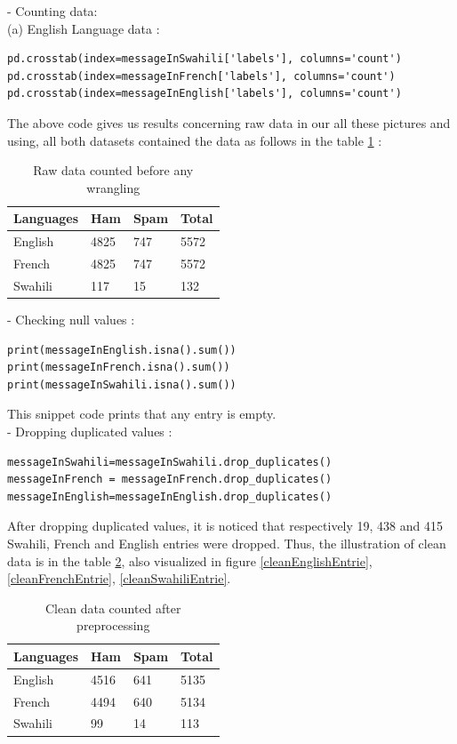 \documentclass[12pt,a4paper, oneside]{book}
\begin{document}
- Counting data:\\
(a) English Language data :

\begin{lstlisting}[style=stylejupyter]
pd.crosstab(index=messageInSwahili['labels'], columns='count') 
pd.crosstab(index=messageInFrench['labels'], columns='count')
pd.crosstab(index=messageInEnglish['labels'], columns='count')
\end{lstlisting}

The above code gives us results concerning raw data in our   all these pictures and using, all both datasets contained the data as follows in the table \ref{tab:rawdatacollected} : \\
\begin{table}[h]
	\centering
\begin{tabular}{|p{3cm}|p{3.5cm}|p{3cm}|p{4cm}|} 
	\hline
	Languages & Ham  & Spam & Total\\
	\hline
	English & 4825 & 747  & 5572  \\
	\hline
	French&  4825 & 747 & 5572  \\ 
	\hline
	Swahili & 117 & 15 & 132\\
	\hline 
\end{tabular}
\caption{Raw data counted before any wrangling} 
\label{tab:rawdatacollected}
\end{table}

- Checking null values :
\begin{lstlisting}[style=stylejupyter]
print(messageInEnglish.isna().sum()) 
print(messageInFrench.isna().sum()) 
print(messageInSwahili.isna().sum()) 
\end{lstlisting}  
This snippet code prints that any entry is empty.\\

- Dropping duplicated values :
\begin{lstlisting}[style=stylejupyter]
messageInSwahili=messageInSwahili.drop_duplicates() 
messageInFrench = messageInFrench.drop_duplicates() 
messageInEnglish=messageInEnglish.drop_duplicates()  
\end{lstlisting}
After dropping duplicated values, it is noticed that respectively 19, 438 and 415  Swahili, French and English entries were dropped. Thus, the illustration of clean data is in the table \ref{cleandatacollected}, also visualized in figure \ref{cleanEnglishEntrie},  \ref{cleanFrenchEntrie}, \ref{cleanSwahiliEntrie}.
\begin{table}[h!]
	\centering
	\begin{tabular}{|p{3cm}|p{3.5cm}|p{3cm}|p{4cm}|} 
		\hline
		Languages & Ham  & Spam & Total\\
		\hline
		English & 4516 & 641  & 5135  \\
		\hline
		French&  4494 & 640 & 5134\\ 
		\hline
		Swahili & 99 & 14 & 113 \\
		\hline 
	\end{tabular}
		\caption{Clean data counted after preprocessing} 
	\label{cleandatacollected}
\end{table}
 
\end{document}
